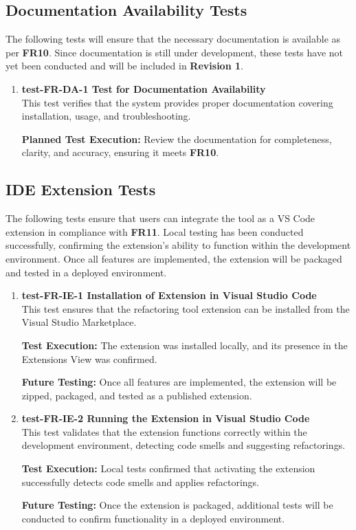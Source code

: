 \documentclass[12pt, titlepage]{article}
\begin{document}
\subsection{Documentation Availability Tests}
The following tests will ensure that the necessary documentation is
available as per \textbf{FR10}. Since documentation is still under
development, these tests have not yet been conducted and will be
included in \textbf{Revision 1}.

\begin{enumerate}
  \item \textbf{test-FR-DA-1 Test for Documentation Availability} \\[2mm]
    This test verifies that the system provides proper documentation
    covering installation, usage, and troubleshooting.

    \textbf{Planned Test Execution:} Review the documentation for
    completeness, clarity, and accuracy, ensuring it meets \textbf{FR10}.
\end{enumerate}

\subsection{IDE Extension Tests}
The following tests ensure that users can integrate the tool as a VS
Code extension in compliance with \textbf{FR11}. Local testing has
been conducted successfully, confirming the extension’s ability to
function within the development environment. Once all features are
implemented, the extension will be packaged and tested in a deployed
environment.

\begin{enumerate}
  \item \textbf{test-FR-IE-1 Installation of Extension in Visual
    Studio Code} \\[2mm]
    This test ensures that the refactoring tool extension can be
    installed from the Visual Studio Marketplace.

    \textbf{Test Execution:} The extension was installed locally, and
    its presence in the Extensions View was confirmed.

    \textbf{Future Testing:} Once all features are implemented, the
    extension will be zipped, packaged, and tested as a published extension.

  \item \textbf{test-FR-IE-2 Running the Extension in Visual Studio
    Code} \\[2mm]
    This test validates that the extension functions correctly within
    the development environment, detecting code smells and suggesting
    refactorings.

    \textbf{Test Execution:} Local tests confirmed that activating
    the extension successfully detects code smells and applies refactorings.

    \textbf{Future Testing:} Once the extension is packaged,
    additional tests will be conducted to confirm functionality in a
    deployed environment.
\end{enumerate}
\end{document}
